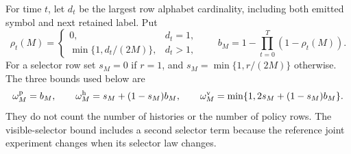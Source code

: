 For time $t$, let $d_t$ be the largest row alphabet cardinality,
including both emitted symbol and next retained label. Put
\[
 \rho_t(M)=\begin{cases}0,&d_t=1,\\
       \min\{1,d_t/(2M)\},&d_t>1,
       \end{cases}\qquad
 b_M=1-\prod_{t=0}^{T}(1-\rho_t(M)).
\]
For a selector row set $s_M=0$ if $r=1$, and
$s_M=\min\{1,r/(2M)\}$ otherwise. The three bounds used below are
\begin{equation}\label{eq:v14-modulus}
 \omega_M^{\rm p}=b_M,\qquad
 \omega_M^{\rm h}=s_M+(1-s_M)b_M,\qquad
 \omega_M^{\rm v}=\min\{1,2s_M+(1-s_M)b_M\}.
\end{equation}
They do not count the number of histories or the number of policy rows.
The visible-selector bound includes a second selector term because the
reference joint experiment changes when its selector law changes.

